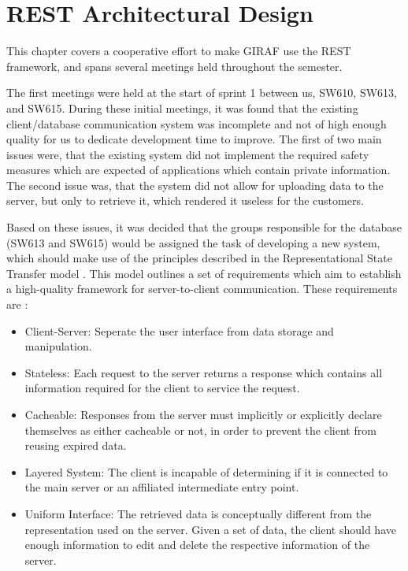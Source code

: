 \chapter{REST Architectural Design}\label{S1CS}
This chapter covers a cooperative effort to make GIRAF use the REST framework,
and spans several meetings held throughout the semester.\nl

The first meetings were held at the start of sprint 1 between us, SW610,
SW613, and SW615. During these initial meetings, it was found that the existing
client/database communication system was incomplete and not of high enough
quality for us to dedicate development time to improve. The first of two main
issues were, that the existing system did not implement the required safety
measures which are expected of applications which contain private
information. The second issue was, that the system did not allow for uploading
data to the server, but only to retrieve it, which rendered it useless for
the customers.\nl

Based on these issues, it was decided that the groups responsible for the
database (SW613 and SW615) would be assigned the task of developing a new
system, which should make use of the principles described in the 
Representational State Transfer model \citep{RESTInfo}. This model outlines a
set of requirements which aim to establish a high-quality framework for
server-to-client communication. These requirements are \citep{RESTInfo}:

\begin{itemize}
  \item Client-Server: Seperate the user interface from data storage and
  manipulation.
  \item Stateless: Each request to the server returns a response which contains
  all information required for the client to service the request.
  \item Cacheable: Responses from the server must implicitly or explicitly
  declare themselves as either cacheable or not, in order to prevent the client
  from reusing expired data.
  \item Layered System: The client is incapable of determining if it is connected
  to the main server or an affiliated intermediate entry point.
  \item Uniform Interface: The retrieved data is conceptually different from the
  representation used on the server. Given a set of data, the client should have
  enough information to edit and delete the respective information of the
  server. 
\end{itemize}

